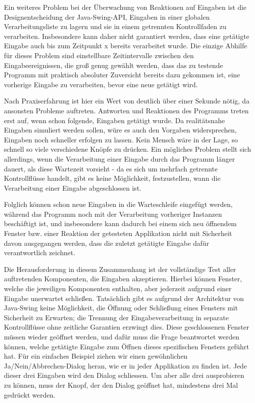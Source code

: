 Ein weiteres Problem bei der Überwachung von Reaktionen auf
Eingaben ist die Designentscheidung der Java-Swing-API,
Eingaben in einer globalen Verarbeitungsliste zu lagern
und sie in einem getrennten Kontrollfaden zu verarbeiten.
Insbesondere kann daher nicht garantiert werden,
dass eine getätigte Eingabe auch bis zum Zeitpunkt x
bereits verarbeitet wurde. Die einzige Abhilfe für dieses
Problem sind einstellbare Zeitintervalle zwischen
den Eingabeereignissen, die groß genug gewählt werden,
dass das zu testende Programm mit praktisch absoluter
Zuversicht bereits dazu gekommen ist, eine vorherige
Eingabe zu verarbeiten, bevor eine neue getätigt wird.

Nach Praxiserfahrung ist hier ein Wert von deutlich über
einer Sekunde nötig, da ansonsten Probleme auftreten. 
Antworten und Reaktionen des Programms treten erst auf,
wenn schon folgende, Eingaben getätigt wurde. Da realitätsnahe
Eingaben simuliert werden sollen, würe es auch den Vorgaben
widersprechen, Eingaben noch schneller erfolgen zu lassen. Kein Mensch
wäre in der Lage, so schnell so viele verschiedene Knöpfe
zu drücken. Ein mögliches Problem stellt sich allerdings,
wenn die Verarbeitung einer Eingabe durch das Programm länger dauert,
als diese Wartezeit vorsieht - da es sich um mehrfach getrennte
Kontrollflüsse handelt, gibt es keine Möglichkeit,
festzustellen, wann die Verarbeitung einer Eingabe abgeschlossen ist.

Folglich können schon neue Eingaben in die Warteschleife
eingefügt werden, während das Programm noch mit der Verarbeitung
vorheriger Instanzen beschäftigt ist, und insbesondere kann
dadurch bei einem sich neu öffnendem Fenster bzw. einer Reaktion
der getesteten Applikation nicht mit Sicherheit davon ausgegangen
werden, dass die zuletzt getätigte Eingabe dafür verantwortlich zeichnet.

Die Herausforderung in diesem Zusammenhang ist der vollständige Test
aller auftretenden Komponenten, die Eingaben akzeptieren. Hierbei
können Fenster, welche die jeweiligen Komponenten enthalten, 
aber jederzeit aufgrund einer Eingabe \glqq{}unerwartet\grqq{} schließen. 
Tatsächlich gibt es aufgrund der Architektur von Java-Swing
keine Möglichkeit, die Öffnung oder Schließung eines Fensters
mit Sicherheit zu Erwarten; die Trennung der Eingabeverarbeitung
in separate Kontrollflüsse ohne zeitliche Garantien erzwingt dies.
Diese geschlossenen Fenster müssen wieder geöffnet werden, und dafür
muss die Frage beantwortet werden können, welche getätigte Eingabe zum
Öffnen dieses spezifischen Fensters geführt hat. Für ein einfaches
Beispiel ziehen wir einen gewöhnlichen Ja/Nein/Abbrechen-Dialog
heran, wie er in jeder Applikation zu finden ist. Jede dieser drei
Eingaben wird den Dialog schliessen. Um aber alle drei ausprobieren
zu können, muss der Knopf, der den Dialog geöffnet hat, mindestens drei Mal
gedrückt werden.


